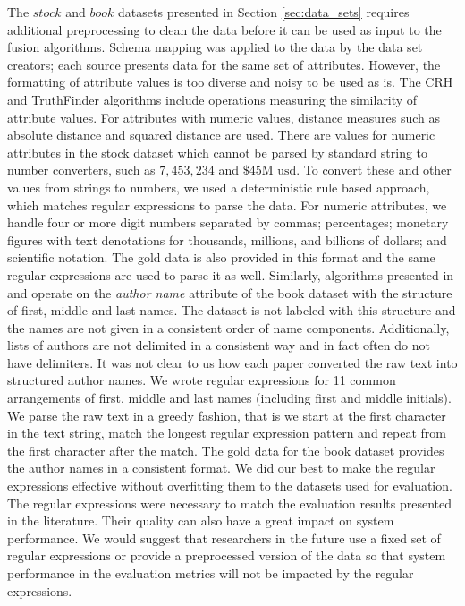 \documentclass{acm_proc_article-sp}
\begin{document}
The $stock$ and $book$ datasets presented in Section \ref{sec:data_sets} requires additional preprocessing to clean the data before it can be used as input to the fusion algorithms. Schema mapping was applied to the data by the data set creators; each source presents data for the same set of attributes. However, the formatting of attribute values is too diverse and noisy to be used as is.  The {\sc CRH} and {\sc TruthFinder} algorithms include operations measuring the similarity of attribute values. For attributes with numeric values, distance measures such as absolute distance and squared distance are used.  There are values for numeric attributes in the stock dataset which cannot be parsed by standard string to number converters, such as $7,453,234$ and $\$45\text{M usd}$. To convert these and other values from strings to numbers, we used a deterministic rule based approach, which matches regular expressions to parse the data. For numeric attributes, we handle four or more digit numbers separated by commas; percentages; monetary figures with text denotations for thousands, millions, and billions of dollars; and scientific notation. The gold data is also provided in this format and the same regular expressions are used to parse it as well. Similarly, algorithms presented in \cite{dong:integrating} and \cite{yin:truth} operate on the \emph{author name} attribute of the book dataset with the structure of first, middle and last names. The dataset is not labeled with this structure and the names are not given in a consistent order of name components. Additionally, lists of authors are not delimited in a consistent way and in fact often do not have delimiters. It was not clear to us how each paper converted the raw text into structured author names. We wrote regular expressions for  11 common arrangements of first, middle and last names (including first and middle initials). We parse the raw text in a greedy fashion, that is we start at the first character in the text string, match the longest regular expression pattern and repeat from the first character after the match. The gold data for the book dataset provides the author names in a consistent format. We did our best to make the regular expressions effective without overfitting them to the datasets used for evaluation. The regular expressions were necessary to match the evaluation results presented in the literature. Their quality can also have a great impact on system performance. We would suggest that researchers in the future use a fixed set of regular expressions or provide a preprocessed version of the data so that system performance in the evaluation metrics will not be impacted by the regular expressions. 
\end{document}
